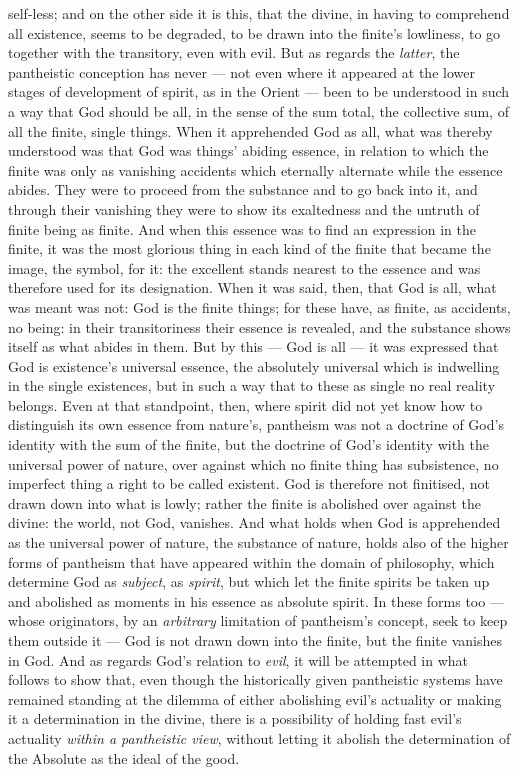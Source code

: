 \documentclass[12pt,a4paper]{book}
\begin{document}
self-less; and on the other side it is this, that the divine, in having to
comprehend all existence, seems to be degraded, to be drawn into the finite's
lowliness, to go together with the transitory, even with evil. But as regards
the \emph{latter},
the pantheistic conception has never --- not even where it appeared at the
lower stages of development of spirit, as in the Orient --- been to be
understood in such a way that God should be all, in the sense of the sum
total, the collective sum, of all the finite, single things. When it
apprehended God as all, what was thereby understood was that God was things'
abiding essence, in relation to which the finite was only as vanishing
accidents which eternally alternate while the essence abides. They were to
proceed from the substance and to go back into it, and through their vanishing
they were to show its exaltedness and the untruth of finite being as finite.
And when this essence was to find an expression in the finite, it was the most
glorious thing in each kind of the finite that became the image, the symbol,
for it: the excellent stands nearest to the essence and was therefore used for
its designation. When it was said, then, that God is all, what was meant was
not: God is the finite things; for these have, as finite, as accidents, no
being: in their transitoriness their essence is revealed, and the substance
shows itself as what abides in them. But by this --- God is all --- it was
expressed that God is existence's universal essence, the absolutely universal
which is indwelling in the single existences, but in such a way that to these
as single no real reality belongs. Even at that standpoint, then, where spirit
did not yet know how to distinguish its own essence from nature's, pantheism
was not a doctrine of God's identity with the sum of the finite, but the
doctrine of God's identity with the universal power of nature, over against
which no finite thing has subsistence, no imperfect thing a right to be called
existent. God is therefore not finitised, not drawn down into what is lowly;
rather the finite is abolished over against the divine: the world, not God,
vanishes. And what holds when God is apprehended as the universal power of
nature, the substance of nature, holds also of the higher forms of pantheism
that have appeared within the domain of philosophy, which determine God as
\emph{subject}, as \emph{spirit}, but which let the finite spirits be taken up
and abolished as moments in his essence as absolute spirit. In these
forms too --- whose originators, by an \emph{arbitrary} limitation of
pantheism's concept, seek to keep them outside it --- God is not drawn down
into the finite, but the finite vanishes in God. And as regards God's relation
to \emph{evil}, it will be attempted in what follows to show that, even though
the historically given pantheistic systems have remained standing at the
dilemma of either abolishing evil's actuality or making it a determination in
the divine, there is a possibility of holding fast evil's actuality
\emph{within a pantheistic view}, without letting it abolish the determination
of the Absolute as the ideal of the good.
\end{document}
